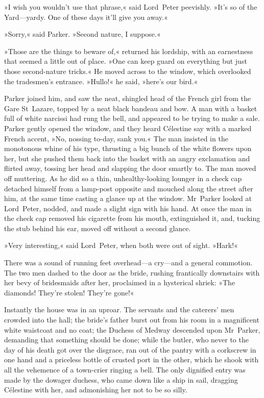 »I wish you wouldn't use that phrase,« said Lord~Peter peevishly. »It's so of the Yard—yardy. One of these days it'll give you away.«

»Sorry,« said Parker. »Second nature, I suppose.«

»Those are the things to beware of,« returned his lordship, with an earnestness that seemed a little out of place. »One can keep guard on everything but just those second-nature tricks.« He moved across to the window, which overlooked the tradesmen's entrance. »Hullo!« he said, »here's our bird.«

Parker joined him, and saw the neat, shingled head of the French girl from the Gare St~Lazare, topped by a neat black bandeau and bow. A man with a basket full of white narcissi had rung the bell, and appeared to be trying to make a sale. Parker gently opened the window, and they heard Célestine say with a marked French accent, »No, nossing to-day, sank you.« The man insisted in the monotonous whine of his type, thrusting a big bunch of the white flowers upon her, but she pushed them back into the basket with an angry exclamation and flirted away, tossing her head and slapping the door smartly to. The man moved off muttering. As he did so a thin, unhealthy-looking lounger in a check cap detached himself from a lamp-post opposite and mouched along the street after him, at the same time casting a glance up at the window. Mr~Parker looked at Lord~Peter, nodded, and made a slight sign with his hand. At once the man in the check cap removed his cigarette from his mouth, extinguished it, and, tucking the stub behind his ear, moved off without a second glance.

»Very interesting,« said Lord~Peter, when both were out of sight. »Hark!«

There was a sound of running feet overhead—a cry—and a general commotion. The two men dashed to the door as the bride, rushing frantically downstairs with her bevy of bridesmaids after her, proclaimed in a hysterical shriek: »The diamonds! They're stolen! They're gone!«

Instantly the house was in an uproar. The servants and the caterers' men crowded into the hall; the bride's father burst out from his room in a magnificent white waistcoat and no coat; the Duchess of Medway descended upon Mr~Parker, demanding that something should be done; while the butler, who never to the day of his death got over the disgrace, ran out of the pantry with a corkscrew in one hand and a priceless bottle of crusted port in the other, which he shook with all the vehemence of a town-crier ringing a bell. The only dignified entry was made by the dowager duchess, who came down like a ship in sail, dragging Célestine with her, and admonishing her not to be so silly.

